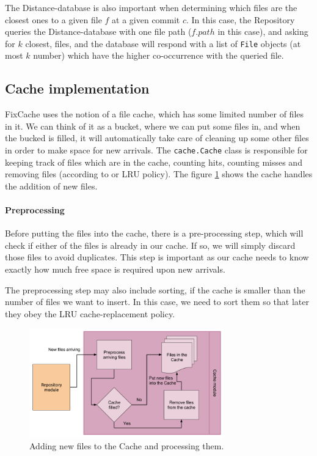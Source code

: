 \documentclass[12pt,twoside,notitlepage]{report}
\newcommand{\fxch}{FixCache}
\begin{document}
The Distance-database is also important when determining which files are the closest ones to a given file $f$ at a given commit $c$. In this case, the Repository queries the Distance-database with one file path ($f.path$ in this case), and asking for $k$ closest, files, and the database will respond with a list of \texttt{File} objects (at most $k$ number) which have the higher co-occurrence with the queried file.
\subsection{Cache implementation}
\fxch{} uses the notion of a file cache, which has some limited number of files in it. We can think of it as a bucket, where we can put some files in, and when the bucked is filled, it will automatically take care of cleaning up some other files in order to make space for new arrivals. The \texttt{cache.Cache} class is responsible for keeping track of files which are in the cache, counting hits, counting misses and removing files (according to or LRU policy). The figure \ref{cache_module} shows the cache handles the addition of new files.

\paragraph{Preprocessing}
Before putting the files into the cache, there is a pre-processing step, which will check if either of the files is already in our cache. If so, we will simply discard those files to avoid duplicates. This step is important as our cache needs to know exactly how much free space is required upon new arrivals.

The preprocessing step may also include sorting, if the cache is smaller than the number of files we want to insert. In this case, we need to sort them so that later they obey the LRU cache-replacement policy.
\begin{figure}[h]
\centering
    \includegraphics[width=0.75\textwidth]{cache_module.png}
  \caption{Adding new files to the Cache and processing them.}
  \label{cache_module}
\end{figure}
\end{document}
